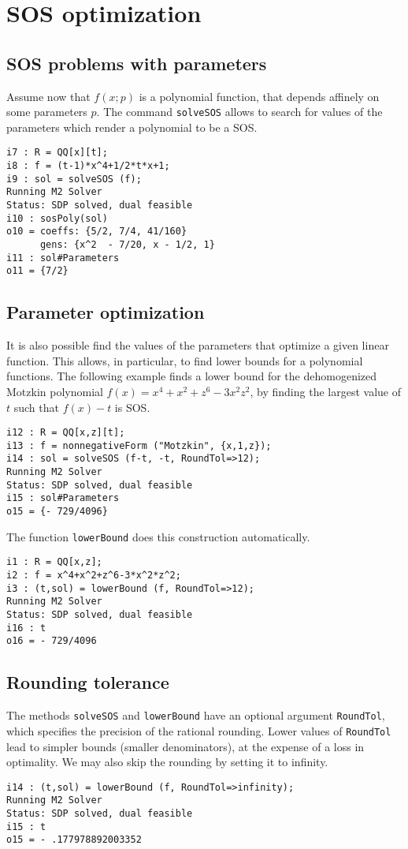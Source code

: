 \documentclass[11pt]{amsart}
\theoremstyle{plain}%
\theoremstyle{definition}
\theoremstyle{remark}
\begin{document}

\section{SOS optimization}

\subsection*{SOS problems with parameters}
Assume now that $f(x;p)$ is a polynomial function, that depends affinely on some parameters $p$.
The command \verb|solveSOS| allows to search for values of the parameters which render a polynomial to be a SOS.
{\small
\begin{verbatim}
i7 : R = QQ[x][t];
i8 : f = (t-1)*x^4+1/2*t*x+1;
i9 : sol = solveSOS (f);
Running M2 Solver
Status: SDP solved, dual feasible
i10 : sosPoly(sol)
o10 = coeffs: {5/2, 7/4, 41/160}
      gens: {x^2  - 7/20, x - 1/2, 1}
i11 : sol#Parameters
o11 = {7/2}
\end{verbatim}
}

\subsection*{Parameter optimization}
It is also possible find the values of the parameters that optimize a given linear function.
This allows, in particular, to find lower bounds for a polynomial functions.
The following example finds a lower bound for the dehomogenized Motzkin polynomial $f(x)=x^4{+}x^2{+}z^6{-}3 x^2 z^2$, by finding the largest value of $t$ such that $f(x)-t$ is SOS.
{\small
\begin{verbatim}
i12 : R = QQ[x,z][t];
i13 : f = nonnegativeForm ("Motzkin", {x,1,z});
i14 : sol = solveSOS (f-t, -t, RoundTol=>12);
Running M2 Solver
Status: SDP solved, dual feasible
i15 : sol#Parameters
o15 = {- 729/4096}
\end{verbatim}
}
The function \verb|lowerBound| does this construction automatically.
{\small
\begin{verbatim}
i1 : R = QQ[x,z];
i2 : f = x^4+x^2+z^6-3*x^2*z^2;
i3 : (t,sol) = lowerBound (f, RoundTol=>12);
Running M2 Solver
Status: SDP solved, dual feasible
i16 : t
o16 = - 729/4096
\end{verbatim}
}

\subsection*{Rounding tolerance}
The methods \verb|solveSOS| and \verb|lowerBound| have an optional argument \verb|RoundTol|, which specifies the precision of the rational rounding.
Lower values of \verb|RoundTol| lead to simpler bounds (smaller denominators), at the expense of a loss in optimality.
We may also skip the rounding by setting it to infinity.
{\small
\begin{verbatim}
i14 : (t,sol) = lowerBound (f, RoundTol=>infinity);
Running M2 Solver
Status: SDP solved, dual feasible
i15 : t
o15 = - .177978892003352
\end{verbatim}
}
\end{document}
